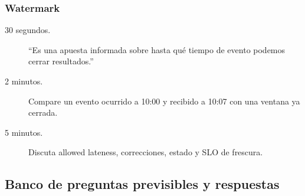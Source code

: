 \documentclass[variant=docente,cover=institutional,mode=screen]{ua-engineering-v6-article}
\begin{document}
\subsubsection{Watermark}
\begin{description}
\item[30 segundos.] ``Es una apuesta informada sobre hasta qué tiempo de evento podemos cerrar resultados.''
\item[2 minutos.] Compare un evento ocurrido a 10:00 y recibido a 10:07 con una ventana ya cerrada.
\item[5 minutos.] Discuta allowed lateness, correcciones, estado y SLO de frescura.
\end{description}

\subsection{Banco de preguntas previsibles y respuestas}
\end{document}
